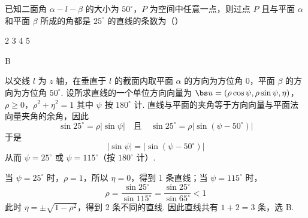 \begin{problem}
已知二面角 \(\alpha - l - \beta\) 的大小为 \(50^{\circ}\)，\(P\) 为空间中任意一点，则过点 \(P\) 且与平面 \(\alpha\) 和平面 \(\beta\) 所成的角都是 \(25^{\circ}\) 的直线的条数为（\quad）

\choices
    {2}
    {3}
    {4}
    {5}

\begin{answer}
B
\end{answer}

\begin{solution}
以交线 \(l\) 为 \(z\) 轴，在垂直于 \(l\) 的截面内取平面 \(\alpha\) 的方向为方位角 \(0\)，平面 \(\beta\) 的方向为方位角 \(50^{\circ}\). 设所求直线的一个单位方向向量为
\(\bs u=(\rho\cos\psi,\rho\sin\psi,\eta)\)，\(\rho\geqslant0\)，\(\rho^{2}+\eta^{2}=1\)
其中 \(\psi\) 按 \(180^{\circ}\) 计. 直线与平面的夹角等于方向向量与平面法向量夹角的余角，因此
\[
\sin25^{\circ}=\rho|\sin\psi|
\quad\text{且}\quad
\sin25^{\circ}=\rho|\sin(\psi-50^{\circ})|
\]
于是
\[
|\sin\psi|=|\sin(\psi-50^{\circ})|
\]
从而 \(\psi=25^{\circ}\) 或 \(\psi=115^{\circ}\)（按 \(180^{\circ}\) 计）.

当 \(\psi=25^{\circ}\) 时，\(\rho=1\)，所以 \(\eta=0\)，得到 1 条直线；当 \(\psi=115^{\circ}\) 时，
\[
\rho=\frac{\sin25^{\circ}}{\sin115^{\circ}}
=\frac{\sin25^{\circ}}{\sin65^{\circ}}<1
\]
此时 \(\eta=\pm\sqrt{1-\rho^{2}}\)，得到 2 条不同的直线. 因此直线共有 \(1+2=3\) 条，选 B.
\end{solution}
\end{problem}

